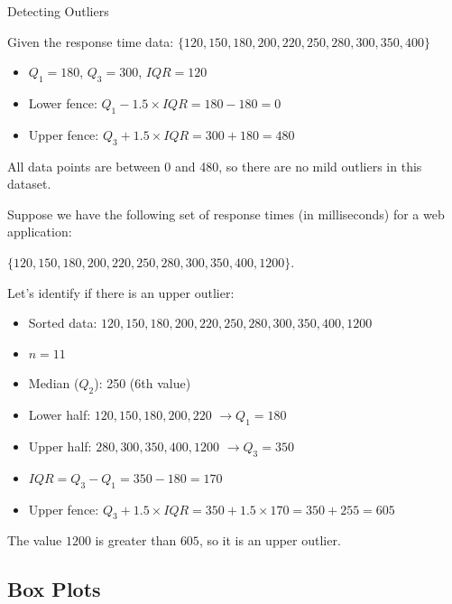 \begin{example} Detecting Outliers

Given the response time data: $\{120, 150, 180, 200, 220, 250, 280, 300, 350, 400\}$

\begin{itemize}
    \item $Q_1 = 180$, $Q_3 = 300$, $IQR = 120$
    \item Lower fence: $Q_1 - 1.5 \times IQR = 180 - 180 = 0$
    \item Upper fence: $Q_3 + 1.5 \times IQR = 300 + 180 = 480$
\end{itemize}

All data points are between 0 and 480, so there are no mild outliers in this dataset.

\end{example}

\newpage

\begin{example}

Suppose we have the following set of response times (in milliseconds) for a web application:

$\{120, 150, 180, 200, 220, 250, 280, 300, 350, 400, 1200\}$.

Let's identify if there is an upper outlier:

\begin{itemize}
    \item Sorted data: $120, 150, 180, 200, 220, 250, 280, 300, 350, 400, 1200$
    \item $n = 11$
    \item Median ($Q_2$): 250 (6th value)
    \item Lower half: $120, 150, 180, 200, 220$ $\rightarrow Q_1 = 180$
    \item Upper half: $280, 300, 350, 400, 1200$ $\rightarrow Q_3 = 350$
    \item $IQR = Q_3 - Q_1 = 350 - 180 = 170$
    \item Upper fence: $Q_3 + 1.5 \times IQR = 350 + 1.5 \times 170 = 350 + 255 = 605$
\end{itemize}

The value $1200$ is greater than $605$, so it is an upper outlier.

\end{example}

\subsection*{Box Plots}

